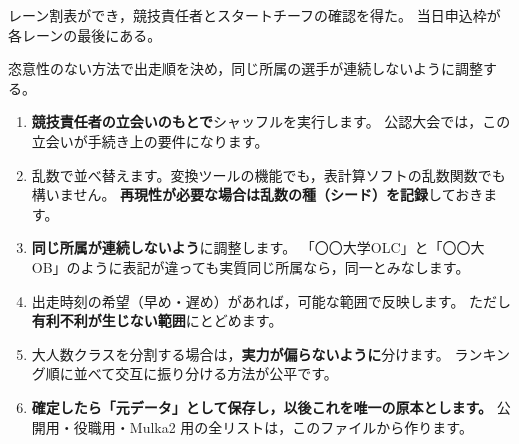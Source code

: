 \begin{Done}
レーン割表ができ，競技責任者とスタートチーフの確認を得た。
当日申込枠が各レーンの最後にある。
\end{Done}


\begin{Goal}
恣意性のない方法で出走順を決め，同じ所属の選手が連続しないように調整する。
\end{Goal}

\begin{enumerate}
\item \textbf{競技責任者の立会いのもとで}シャッフルを実行します。
      公認大会では，この立会いが手続き上の要件になります。
\item 乱数で並べ替えます。変換ツールの機能でも，表計算ソフトの乱数関数でも構いません。
      \textbf{再現性が必要な場合は乱数の種（シード）を記録}しておきます。
\item \textbf{同じ所属が連続しないよう}に調整します。
      「〇〇大学OLC」と「〇〇大OB」のように表記が違っても実質同じ所属なら，同一とみなします。
\item 出走時刻の希望（早め・遅め）があれば，可能な範囲で反映します。
      ただし\textbf{有利不利が生じない範囲}にとどめます。
\item 大人数クラスを分割する場合は，\textbf{実力が偏らないように}分けます。
      ランキング順に並べて交互に振り分ける方法が公平です。\tRANK
\item \textbf{確定したら「元データ」として保存し，以後これを唯一の原本とします。}
      公開用・役職用・Mulka2 用の全リストは，このファイルから作ります。
\end{enumerate}

